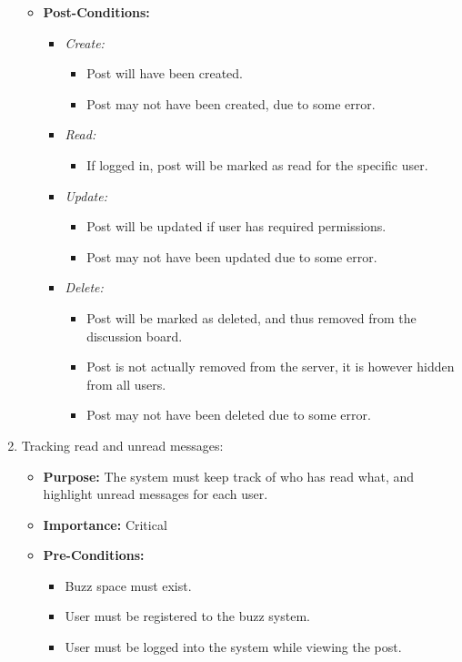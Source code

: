 \documentclass[11pt]{article}
\begin{document}
\begin{enumerate}
\begin{itemize}
\begin{itemize}
		\end{itemize}
		\item \textbf{Post-Conditions: }
		\begin{itemize}
		\item \textit{Create: }
			\begin{itemize}
			\item Post will have been created.
			\item Post may not have been created, due to some error.
			\end{itemize}
		\item \textit{Read: }
			\begin{itemize}
			\item If logged in, post will be marked as read for the 				specific user.
			\end{itemize}
		\item \textit{Update: }
			\begin{itemize}
			\item Post will be updated if user has required 						permissions.
			\item Post may not have been updated due to some error.
			\end{itemize}
		\item \textit{Delete: }
			\begin{itemize}
			\item Post will be marked as deleted, and thus removed 					from the discussion board.
			\item Post is not actually removed from the server, it is 					however hidden from all users.
		\item Post may not have been deleted due to some error. 
			\end{itemize}			
			
		\end{itemize}
	
	\end{itemize}
	
\item Tracking read and unread messages:
\begin{itemize}
\item 
\textbf{Purpose:}
The system must keep track of who has read what, and highlight unread messages for each user.
\newline

\item \textbf{Importance:} Critical
\item \textbf{Pre-Conditions: }
	\begin{itemize}
	\item Buzz space must exist.
	\item User must be registered to the buzz system.
	\item User must be logged into the system while viewing the post.
	\end{itemize}


\end{itemize}
\end{enumerate}
\end{document}
